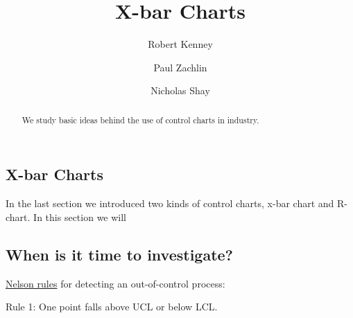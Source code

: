 \documentclass{ximera}
\author{Robert Kenney \and Paul Zachlin \and Nicholas Shay}
\title{X-bar Charts} \license{CC BY-NC-SA 4.0}
\begin{document}
\begin{abstract}
We study basic ideas behind the use of control charts in industry.
\end{abstract}
\maketitle

\begin{onlineOnly}
\section*{X-bar Charts}
\end{onlineOnly}

In the last section we introduced two kinds of control charts, x-bar chart and R-chart.  In this section we will 




\subsection*{When is it time to investigate?}

\href{https://www.qimacros.com/control-chart/nelson-rules/}{Nelson rules} for detecting an out-of-control process:

Rule 1:  One point falls above UCL or below LCL.
\end{document}
